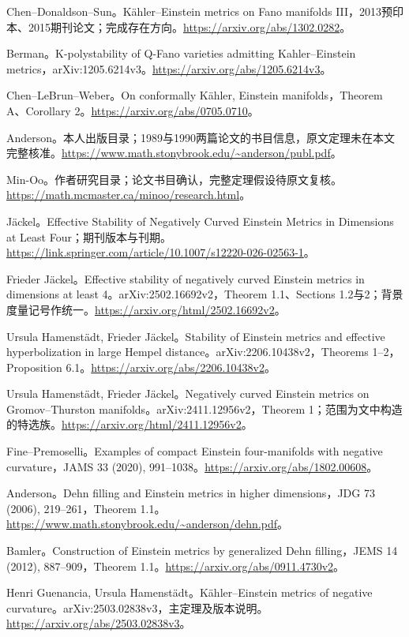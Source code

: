 \documentclass[11pt,a4paper]{article}
\theoremstyle{definition}
\begin{document}
\begin{enumerate}[label={[\arabic*]},leftmargin=2.2em,itemsep=0.55em]
\item Chen--Donaldson--Sun。Kähler--Einstein metrics on Fano manifolds III，2013预印本、2015期刊论文；完成存在方向。\url{https://arxiv.org/abs/1302.0282}。
\item Berman。K-polystability of Q-Fano varieties admitting Kahler--Einstein metrics，arXiv:1205.6214v3。\url{https://arxiv.org/abs/1205.6214v3}。
\item Chen--LeBrun--Weber。On conformally Kähler, Einstein manifolds，Theorem A、Corollary 2。\url{https://arxiv.org/abs/0705.0710}。
\item Anderson。本人出版目录；1989与1990两篇论文的书目信息，原文定理未在本文完整核准。\url{https://www.math.stonybrook.edu/~anderson/publ.pdf}。
\item Min-Oo。作者研究目录；论文书目确认，完整定理假设待原文复核。\url{https://math.mcmaster.ca/minoo/research.html}。
\item Jäckel。Effective Stability of Negatively Curved Einstein Metrics in Dimensions at Least Four；期刊版本与刊期。\url{https://link.springer.com/article/10.1007/s12220-026-02563-1}。
\item Frieder Jäckel。Effective stability of negatively curved Einstein metrics in dimensions at least 4。arXiv:2502.16692v2，Theorem 1.1、Sections 1.2与2；背景度量记号作统一。\url{https://arxiv.org/html/2502.16692v2}。
\item Ursula Hamenstädt, Frieder Jäckel。Stability of Einstein metrics and effective hyperbolization in large Hempel distance。arXiv:2206.10438v2，Theorems 1--2，Proposition 6.1。\url{https://arxiv.org/abs/2206.10438v2}。
\item Ursula Hamenstädt, Frieder Jäckel。Negatively curved Einstein metrics on Gromov--Thurston manifolds。arXiv:2411.12956v2，Theorem 1；范围为文中构造的特选族。\url{https://arxiv.org/html/2411.12956v2}。
\item Fine--Premoselli。Examples of compact Einstein four-manifolds with negative curvature，JAMS 33 (2020), 991--1038。\url{https://arxiv.org/abs/1802.00608}。
\item Anderson。Dehn filling and Einstein metrics in higher dimensions，JDG 73 (2006), 219--261，Theorem 1.1。\url{https://www.math.stonybrook.edu/~anderson/dehn.pdf}。
\item Bamler。Construction of Einstein metrics by generalized Dehn filling，JEMS 14 (2012), 887--909，Theorem 1.1。\url{https://arxiv.org/abs/0911.4730v2}。
\item Henri Guenancia, Ursula Hamenstädt。Kähler--Einstein metrics of negative curvature。arXiv:2503.02838v3，主定理及版本说明。\url{https://arxiv.org/abs/2503.02838v3}。

\end{enumerate}
\end{document}
